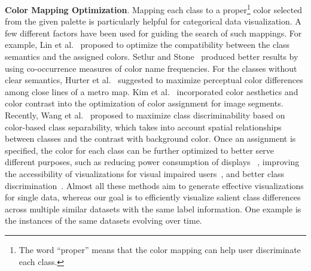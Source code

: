 \vspace{1.5mm}
\noindent\textbf{Color Mapping Optimization}. Mapping each class to a proper\footnote{The word ``proper'' means that the color mapping can help user discriminate each class.} color selected from the given palette is particularly helpful for categorical data visualization.
A few different factors have been used for guiding the search of such mappings.
For example, Lin et al.~\cite{lin2013selecting} proposed to optimize the compatibility between the class semantics and the assigned colors. Setlur and Stone~\cite{setlur2016linguistic} produced better results by using co-occurrence measures of color name frequencies.
For the classes without clear semantics,  Hurter et al.~\cite{Hurter10} suggested to maximize perceptual color differences among close lines of a metro map.
Kim et al.~\cite{Kim14} incorporated color aesthetics and color contrast into the optimization of color assignment for image segments.
Recently, Wang et al.~\cite{Wang2018} proposed to maximize class discriminability based on color-based class separability, which takes into account spatial relationships between classes and the contrast with background color.
Once an assignment is specified, the color for each class can be further optimized to better serve different purposes, such as reducing power consumption of displays~\cite{chuang2009energy} ,
improving the accessibility of visualizations for visual impaired users~\cite{machado2009physiologically}, and better class discrimination~\cite{lee2013perceptually}.
Almost all these methods aim to generate effective visualizations for single data, whereas our goal is to efficiently visualize salient class differences across multiple similar datasets with the same label information. One example is the instances of the same datasets evolving over time.

